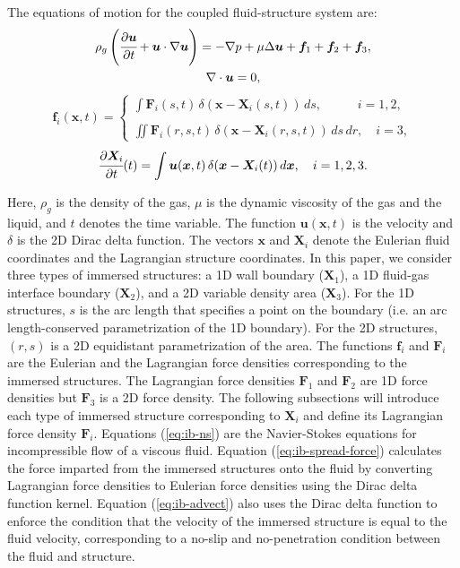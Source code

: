 \documentclass[%
 aip,
 amsmath,amssymb,
 reprint,
 floatfix
]{revtex4-1}
\begin{document}
The equations of motion for the coupled fluid-structure system are:
\begin{multline}
\rho_g\left(\cfrac{\partial\bm{u}}{\partial t}+\bm{u} \cdot \nabla\bm{u}\right) =
    -\nabla p+\mu\Delta\bm{u}+\bm{f}_1+\bm{f}_2+\bm{f}_3,
    \\
    \nabla \cdot \bm{u}=0, \label{eq:ib-ns}
\end{multline}    
\begin{equation}
\bm{f}_i(\bm{x},t)  = 
    \begin{cases}
    \int  \bm{F}_i(   s,t)\,\delta(\bm{x}-\bm{X}_i(s,t))\,ds,    \hspace{34pt} i = 1,2, \\ \\
    \iint \bm{F}_i(r, s,t)\,\delta(\bm{x}-\bm{X}_i(r, s,t))\,ds\,dr, \quad i = 3, 
    \end{cases}
    \label{eq:ib-spread-force}
\end{equation}    
\begin{equation}    
\cfrac{\partial\bm{X}_i}{\partial t}(t) =
    \int\bm{u}(\bm{x},t)\,\delta(\bm{x}-\bm{X}_i(t)) \, d\bm{x}, \quad i = 1,2,3.
    \label{eq:ib-advect}
\end{equation}

Here, $\rho_g$ is the density of the gas, $\mu$ is the dynamic viscosity of the gas and the liquid, and $t$ denotes the time variable. The function $\boldsymbol{u}(\boldsymbol{x},t)$ is the velocity and $\delta$ is the 2D Dirac delta function. The vectors $\boldsymbol{x}$ and $\boldsymbol{X}_i$ denote the Eulerian fluid coordinates and the Lagrangian structure coordinates. In this paper, we consider three types of immersed structures: a 1D wall boundary ($\bm{X}_1$), a 1D fluid-gas interface boundary ($\bm{X}_2$), and a 2D variable density area ($\bm{X}_3$). For the 1D structures, $s$ is the arc length that specifies a point on the boundary (i.e. an arc length-conserved parametrization of the 1D boundary). For the 2D structures, $(r,s)$ is a 2D equidistant parametrization of the area. The functions $\boldsymbol{f}_i$ and $\boldsymbol{F}_i$ are the Eulerian and the Lagrangian force densities corresponding to the immersed structures. The Lagrangian force densities $\boldsymbol{F}_1$ and $\boldsymbol{F}_2$ are 1D force densities but $\boldsymbol{F}_3$ is a 2D force density. The following subsections will introduce each type of immersed structure corresponding to $\boldsymbol{X}_i$ and define its Lagrangian force density $\boldsymbol{F}_i$. Equations (\ref{eq:ib-ns}) are the Navier-Stokes equations for incompressible flow of a viscous fluid. Equation (\ref{eq:ib-spread-force}) calculates the force imparted from the immersed structures onto the fluid by converting Lagrangian force densities to Eulerian force densities using the Dirac delta function kernel. Equation (\ref{eq:ib-advect}) also uses the Dirac delta function to enforce the condition that the velocity of the immersed structure is equal to the fluid velocity, corresponding to a no-slip and no-penetration condition between the fluid and structure. 
\end{document}
